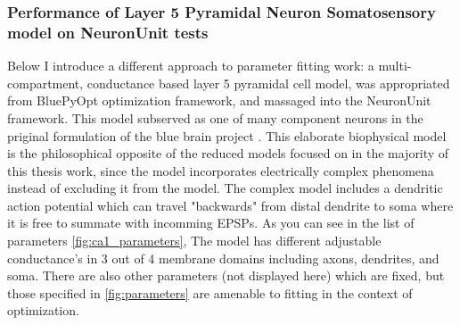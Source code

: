 



%


\subsubsection{Performance of Layer 5 Pyramidal Neuron Somatosensory model on NeuronUnit tests}
\cite{van2016bluepyopt}

Below I introduce a different approach to parameter fitting work: a multi-compartment, conductance based layer 5 pyramidal cell model, was appropriated from BluePyOpt optimization framework, and massaged into the NeuronUnit framework. This model subserved as one of many component neurons in the priginal formulation of the blue brain project \cite{markram2015reconstruction}. This elaborate biophysical model is the philosophical opposite of the reduced models focused on in the majority of this thesis work, since the model incorporates electrically complex phenomena instead of excluding it from the model. The complex model includes a dendritic action potential which can travel "backwards" from distal dendrite to soma where it is free to summate with incomming EPSPs. As you can see in the list of parameters \ref{fig:ca1_parameters}, The model has different adjustable conductance's in 3 out of 4 membrane domains including axons, dendrites, and soma. There are also other parameters (not displayed here) which are fixed, but those specified in \ref{fig:parameters} are amenable to fitting in the context of optimization.

